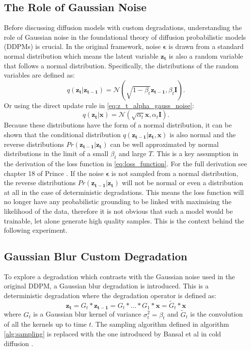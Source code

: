 \documentclass[11pt]{article}
\begin{document}
\subsection{The Role of Gaussian Noise}
Before discussing diffusion models with custom degradations, understanding the role of Gaussian noise in the foundational theory of diffusion probabilistic models (DDPMs) is crucial. In the original framework, noise $\boldsymbol{\epsilon}$ is drawn from a standard normal distribution which means the latent variable $\mathbf{z_t}$ is also a random variable that follows a normal distribution. Specifically, the distributions of the random variables are defined as:
$$
q(\mathbf{z_t}|\mathbf{z_{t-1}}) = \mathcal{N}(\sqrt{1-\beta_t}\mathbf{z_{t-1}}, \beta_t \mathbf{I}).
$$
Or using the direct update rule in \ref{eq:z_t_alpha_gauss_noise}:
$$
q(\mathbf{z_t}|\mathbf{x}) = \mathcal{N}(\sqrt{\alpha_t}\mathbf{x}, \alpha_t\mathbf{I}).
$$
Because these distributions have the form of a normal distribution, it can be shown that the conditional distribution $q(\mathbf{z_{t-1}}|\mathbf{z_t}, \mathbf{x})$ is also normal and the reverse distributions $Pr(\mathbf{z_{t-1}}|\mathbf{z_t})$ can be well approximated by normal distributions in the limit of a small $\beta_t$ and large $T$. This is a key assumption in the derivation of the loss function in \ref{eq:loss_function}. For the full derivation see chapter 18 of Prince \cite{prince}. If the noise $\boldsymbol{\epsilon}$ is not sampled from a normal distribution, the reverse distributions $Pr(\mathbf{z_{t-1}}|\mathbf{z_t})$ will not be normal or even a distribution at all in the case of deterministic degradations. This means the loss function will no longer have any probabilistic grounding to be linked with maximising the likelihood of the data, therefore it is not obvious that such a model would be trainable, let alone generate high quality samples. This is the context behind the following experiment.

\subsection{Gaussian Blur Custom Degradation}
To explore a degradation which contrasts with the Gaussian noise used in the original DDPM, a Gaussian blur degradation is introduced. This is a deterministic
degradation where the degradation operator is defined as:
\begin{equation}
    \mathbf{z_t} = G_t * \mathbf{z_{t-1}} = G_t * \dots * G_1 * \mathbf{x} = \tilde{G}_t * \mathbf{x}
\end{equation}
where $G_t$ is a Gaussian blur kernel of variance $\sigma_t^2 = \beta_t$ and $\tilde{G}_t$ is the convolution of all the kernels up to time $t$. The sampling algorithm defined in algorithm \ref{alg:sampling} is replaced with the one introduced by Bansal et al in cold diffusion \cite{bansal2022cold}.
\end{document}
